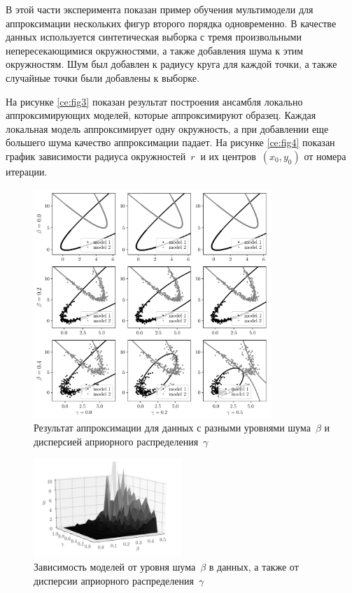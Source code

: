 В этой части эксперимента показан пример обучения мультимодели для аппроксимации нескольких фигур второго порядка одновременно. В качестве данных используется синтетическая выборка с тремя произвольными непересекающимися окружностями, а также добавления шума к этим окружностям. Шум был добавлен к радиусу круга для каждой точки, а также случайные точки были добавлены к выборке.

На рисунке \ref{ce:fig3} показан результат построения ансамбля локально аппроксимирующих моделей, которые аппроксимируют образец. Каждая локальная модель аппроксимирует одну окружность, а при добавлении еще большего шума качество аппроксимации падает.
На рисунке \ref{ce:fig4} показан график зависимости радиуса окружностей~$ r~$ и их центров~$(x_0, y_0)$ от номера итерации.

\begin{figure}[h!t]
\center
\includegraphics[width=0.8\textwidth]{results/priorexpertfig/beta_gamma}
\caption{Результат аппроксимации для данных с разными уровнями шума~$\beta$ и дисперсией априорного распределения~$\gamma$}
\label{ce:fig6}
\end{figure}

\begin{figure}[h!t]
\center
\includegraphics[width=0.5\textwidth]{results/priorexpertfig/3dplot}
\caption{Зависимость моделей от уровня шума~$\beta$ в данных, а также от дисперсии априорного распределения~$\gamma$}
\label{ce:fig5}
\end{figure}

